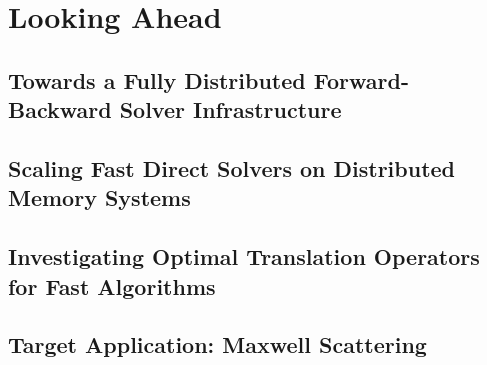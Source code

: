 \chapter{Looking Ahead}\label{chpt:3}


\section{Towards a Fully Distributed Forward-Backward Solver Infrastructure}\label{sec:3_1}


\section{Scaling Fast Direct Solvers on Distributed Memory Systems}\label{sec:3_2}


\section{Investigating Optimal Translation Operators for Fast Algorithms}\label{sec:3_3}


\section{Target Application: Maxwell Scattering}

